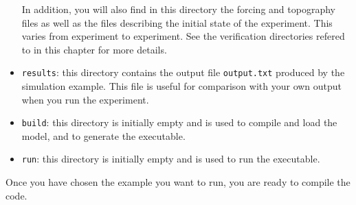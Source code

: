 \begin{itemize}
  In addition, you will also find in this directory the forcing and
  topography files as well as the files describing the initial state
  of the experiment.  This varies from experiment to experiment. See
  the verification directories refered to in this chapter for more details.

\item \texttt{results}: this directory contains the output file
  \texttt{output.txt} produced by the simulation example. This file is
  useful for comparison with your own output when you run the
  experiment.

\item \texttt{build}: this directory is initially empty and is used
  to compile and load the model, and to generate the executable.

\item \texttt{run}: this directory is initially empty and is used
  to run the executable.

\end{itemize}

Once you have chosen the example you want to run, you are ready to
compile the code.

